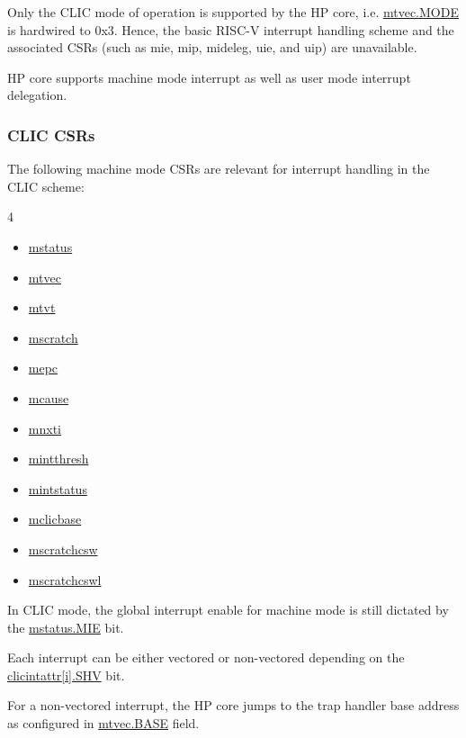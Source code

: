 \documentclass[main\_\_EN.tex]{subfiles}
\begin{document}
Only the CLIC mode of operation is supported by the HP core, i.e. \hyperref[fielddesc:MTVECMODE]{mtvec.MODE} is hardwired to 0x3. Hence, the basic RISC-V interrupt handling scheme and the associated CSRs (such as mie, mip, mideleg, uie, and uip) are unavailable.

HP core supports machine mode interrupt as well as user mode interrupt delegation.

\subsubsection{CLIC CSRs}
\label{sec:riscvcpu-clic-csrs}

The following machine mode CSRs are relevant for interrupt handling in the CLIC scheme:

\begin{multicols}{4}
\begin{itemize}
\item \hyperref[regdesc:MSTATUS]{mstatus}
\item \hyperref[regdesc:MTVEC]{mtvec}
\item \hyperref[regdesc:MTVT]{mtvt}
\item \hyperref[regdesc:MSCRATCH]{mscratch}
\item \hyperref[regdesc:MEPC]{mepc}
\item \hyperref[regdesc:MCAUSE]{mcause}
\item \hyperref[regdesc:MNXTI_REG]{mnxti}
\item \hyperref[regdesc:MINTTHRESH]{mintthresh}
\item \hyperref[regdesc:MINTSTATUS]{mintstatus}
\item \hyperref[regdesc:MCLICBASE_REG]{mclicbase}
\item \hyperref[regdesc:MSCRATCHCSW_REG]{mscratchcsw}
\item \hyperref[regdesc:MSCRATCHCSWL_REG]{mscratchcswl}
\end{itemize}
\end{multicols}



In CLIC mode, the global interrupt enable for machine
mode is still dictated by the \hyperref[fielddesc:MSTATUSMIE]{mstatus.MIE} bit.


Each interrupt can be either vectored or non-vectored depending on the \hyperref[fielddesc:MCLICINTATTR_i_SHV]{clicintattr[i].SHV} bit.

For a non-vectored interrupt, the HP core jumps to the trap handler base address as configured in \hyperref[fielddesc:MTVECBASE]{mtvec.BASE} field.
\end{document}
